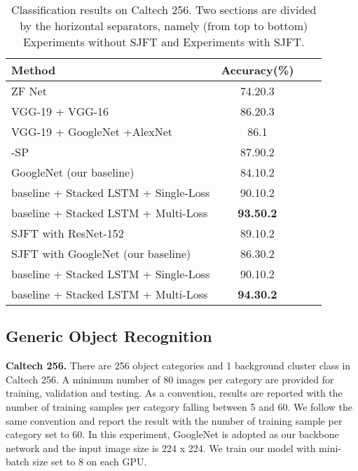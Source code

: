\documentclass[10pt,twocolumn,letterpaper]{article}
\begin{document}
\begin{table}[t]\small
\setlength{\abovecaptionskip}{10pt}
\setlength{\belowcaptionskip}{-10pt}
\begin{center}
\begin{tabular}{@{}lccc@{}}
\toprule
Method                                               & Accuracy(\%)          \\ \midrule
ZF Net \cite{zfnet}                                  & 74.20.3          \\
VGG-19 + VGG-16 \cite{vgg}                           & 86.20.3          \\
VGG-19 + GoogleNet +AlexNet \cite{kim15}             & 86.1                  \\
-SP \cite{Li2018ExplicitIB}                   & 87.90.2          \\
GoogleNet (our baseline)                             & 84.10.2               \\
baseline + Stacked LSTM + Single-Loss                & 90.10.2               \\
baseline + Stacked LSTM + Multi-Loss                 & \textbf{93.50.2}      \\\midrule
SJFT with ResNet-152 \cite{GeYu17}                   & 89.10.2          \\
SJFT with GoogleNet (our baseline)                       & 86.30.2          \\
baseline + Stacked LSTM + Single-Loss                & 90.10.2          \\
baseline + Stacked LSTM + Multi-Loss                 & \textbf{94.30.2} \\
\bottomrule
\end{tabular}
\end{center}
\caption{Classification results on Caltech 256. Two sections are divided by the horizontal separators, namely (from top to bottom) Experiments without SJFT and Experiments with SJFT.}
\label{tab:Caltech256}
\end{table}



\subsection{Generic Object Recognition}
\noindent\textbf{Caltech 256.} There are 256 object categories and 1 background cluster class in Caltech 256. A minimum number of 80 images per category are provided for training, validation and testing. As a convention, results are reported with the number of training samples per category falling between 5 and 60. We follow the same convention and report the result with the number of training sample per category set to 60. In this experiment, GoogleNet is adopted as our backbone network and the input image size is 224 x 224. We train our model with mini-batch size set to 8 on each GPU.
\end{document}

